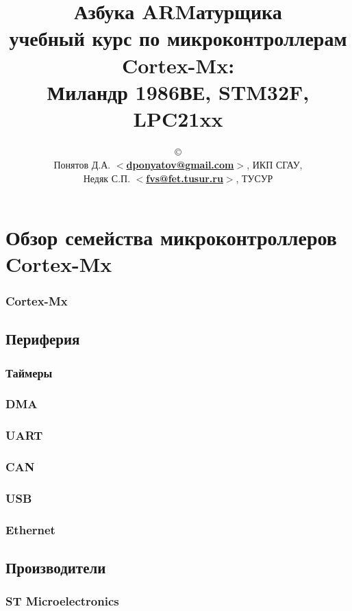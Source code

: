\documentclass[oneside,12pt]{book}
\newcommand{\cm}[1]{Cortex-M#1}
\newcommand{\cx}{\cm{x}}
\newcommand{\email}[1]{$<$\href{mailto:#1}{\textbf{#1}}$>$}
\begin{document}
\title{\Huge{Азбука ARMатурщика}\\
\normalsize{учебный курс по микроконтроллерам \cx:\\
Миландр 1986ВЕ, STM32F, LPC21xx}}
\author{\copyright\\
Понятов Д.А. \email{dponyatov@gmail.com}, ИКП СГАУ, \\
Недяк С.П. \email{fvs@fet.tusur.ru}, ТУСУР
}
\maketitle
\tableofcontents

\part{Обзор семейства микроконтроллеров \cx}



\section{\cx}
\chapter{Периферия}
\section{Таймеры}
\section{DMA}
\section{UART}
\section{CAN}
\section{USB}
\section{Ethernet}
\chapter{Производители}
\section{ST Microelectronics}
\end{document}
